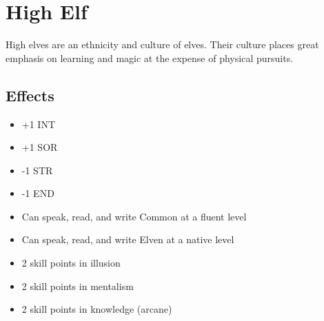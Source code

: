 \section{High Elf}\label{culture:high-elf}
High elves are an ethnicity and culture of elves. Their culture places great
emphasis on learning and magic at the expense of physical pursuits.

\subsection*{Effects}
\begin{itemize}
    \item +1 INT
    \item +1 SOR
    \item -1 STR
    \item -1 END
    \item Can speak, read, and write Common at a fluent level
    \item Can speak, read, and write Elven at a native level
    \item 2 skill points in illusion
    \item 2 skill points in mentalism
    \item 2 skill points in knowledge (arcane)
\end{itemize}
